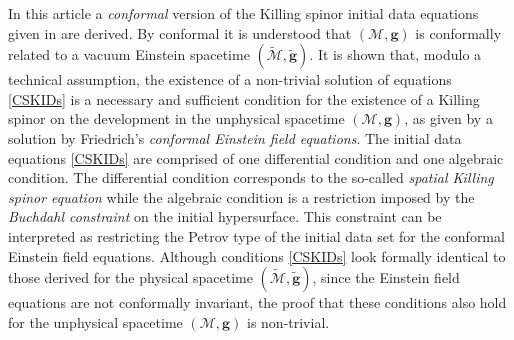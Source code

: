 \documentclass[10pt,a4paper]{article}
\theoremstyle{plain}
\def\bmg{{\bm g}}
\begin{document}
In this article a \emph{conformal} version of the Killing spinor
initial data equations given in \cite{GarVal08c} are derived. By
conformal it is understood that $(\mathcal{M},\bmg)$ is conformally
related to a vacuum Einstein spacetime $(\tilde{\mathcal{M}},\tilde{\bmg})$.
It is shown that, modulo a technical assumption, the existence of a non-trivial solution of equations
\eqref{CSKIDs} is a necessary and sufficient
condition for the existence of a Killing spinor on the development in
the unphysical spacetime $(\mathcal{M},\bmg)$, as given by a solution by Friedrich's
\emph{conformal Einstein field equations}.
  The initial data equations \eqref{CSKIDs} are comprised of one differential condition and one
  algebraic condition.  The differential condition corresponds to the
  so-called \emph{spatial Killing spinor equation} while the algebraic
  condition is a restriction imposed by the \emph{Buchdahl constraint} on the initial
  hypersurface. This constraint can be interpreted as restricting the Petrov type
  of the initial data set for the conformal Einstein field equations.
  Although conditions \eqref{CSKIDs} look formally
  identical to those derived for the physical spacetime
  $(\tilde{\mathcal{M}},\tilde{\bmg})$, since the Einstein field
  equations are not conformally invariant, the proof that these
  conditions also hold for the unphysical spacetime
  $(\mathcal{M},\bmg)$ is non-trivial.  
  \medskip
\end{document}
